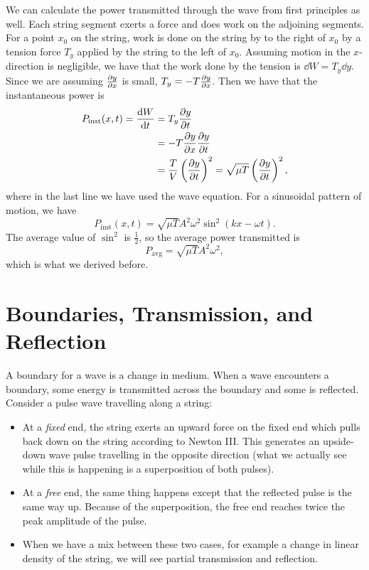 \documentclass[../classical_mechanics.tex]{subfiles}
\begin{document}
        We can calculate the power transmitted through the wave from first principles as well.
        Each string segment exerts a force and does work on the adjoining segments.
        For a point $x_0$ on the string, work is done on the string by to the right of $x_0$ by a tension force $T_y$ applied by the string to the left of $x_0$.
        Assuming motion in the $x$-direction is negligible, we have that the work done by the tension is $\dd{W}=T_y\dd{y}$.
        Since we are assuming $\pdv{y}{x}$ is small, $T_y=-T\pdv{y}{x}$.
        Then we have that the instantaneous power is
        \begin{align}
            P_\text{inst}(x,t)=\dv{W}{t}&=T_y\pdv{y}{t}\\
            &=-T\pdv{y}{x}\pdv{y}{t}\\
            &=\frac{T}{V}\left(\pdv{y}{t}\right)^2=\sqrt{\mu T}\left(\pdv{y}{t}\right)^2,
        \end{align}
        where in the last line we have used the wave equation.
        For a sinusoidal pattern of motion, we have
        \begin{equation}
            P_\text{inst}(x,t)=\sqrt{\mu T}A^2\omega^2\sin^2(kx-\omega t).
        \end{equation}
        The average value of $\sin^2$ is $\frac{1}{2}$, so the average power transmitted is
        \begin{equation}
            P_\text{avg}=\sqrt{\mu T}A^2\omega^2,
        \end{equation}
        which is what we derived before.

    \section{Boundaries, Transmission, and Reflection}\label{sec:boundaries-transmision-and-reflection}
        A boundary for a wave is a change in medium.
        When a wave encounters a boundary, some energy is transmitted across the boundary and some is reflected.
        Consider a pulse wave travelling along a string:
        \begin{itemize}
            \item At a \textit{fixed} end, the string exerts an upward force on the fixed end which pulls back down on the string according to Newton III.
            This generates an upside-down wave pulse travelling in the opposite direction (what we actually see while this is happening is a superposition of both pulses).
            \item At a \textit{free} end, the same thing happens except that the reflected pulse is the same way up.
            Because of the superposition, the free end reaches twice the peak amplitude of the pulse.
            \item When we have a mix between these two cases, for example a change in linear density of the string, we will see partial transmission and reflection.
        \end{itemize}
\end{document}
